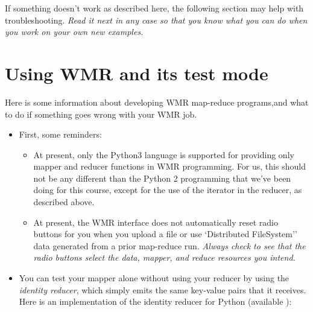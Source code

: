 \documentclass[letterpaper,10pt,openany,oneside]{sphinxmanual}
\begin{document}
If something doesn't work as described here, the following section
may help with troubleshooting. \emph{Read it next in any case so that you
know what you can do when you work on your own new examples.}


\section{Using WMR and its test mode}
\label{wmr_py/wmr_py:using-wmr-and-its-test-mode}
Here is some information about developing WMR map-reduce
programs,and what to do if something goes wrong with your WMR job.
\begin{itemize}
\item {} 
First, some reminders:
\begin{itemize}
\item {} 
At present, only the Python3 language is supported for providing
only mapper and reducer functions in WMR programming. For us, this
should not be any different than the Python 2 programming that
we've been doing for this course, except for the use of the
iterator in the reducer, as described above.

\item {} 
At present, the WMR interface does not automatically reset radio
buttons for you when you upload a file or use {}`Distributed
FileSystem'' data generated from a prior map-reduce run.
\emph{Always check to see that the radio buttons select the data, mapper, and reduce resources you intend.}

\end{itemize}

\item {} 
You can test your mapper alone without using your reducer by
using the \emph{identity reducer}, which simply emits the same key-value
pairs that it receives. Here is an implementation of the identity
reducer for Python (available ):

\end{itemize}
\end{document}
